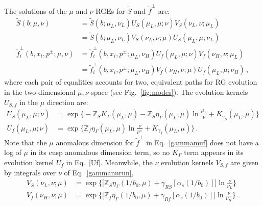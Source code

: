 \documentclass[a4,letterpaper,11pt]{article}
\newcommand{\nn}{\nonumber}
\newcommand{\as}{\alpha_s}
\newcommand{\zed}{\mathbb{Z}}
\newcommand{\wt}{\widetilde}
\newcommand{\eq}[1]{Eq.~\eqref{#1}}
\newcommand{\fig}[1]{Fig.~\ref{fig:#1}}
\begin{document}
The solutions of the $\mu$ and $\nu$ RGEs for $\wt S$ and $\wt f^\perp$ are:
\begin{subequations}
\begin{align}
\label{Sevolved}
\wt S(b;\mu,\nu) &= \wt S(b;\mu_L,\nu_L)U_S(\mu_L,\mu;\nu)V_S(\nu_L,\nu;\mu_L)  \\
&=  \wt S(b;\mu_L,\nu_L)V_S(\nu_L,\nu;\mu)U_S(\mu_L,\mu;\nu_L) \nn \\
\label{fevolved}
\wt f_i^\perp(b,x_i,p^\pm;\mu,\nu) &= \wt f_i^\perp(b,x_i,p^\pm;\mu_L,\nu_H)U_f(\mu_L,\mu;\nu)V_f(\nu_H,\nu;\mu_L) \\
&=  \wt f_i^\perp(b,x_i,p^\pm;\mu_L,\nu_H)V_f(\nu_H,\nu;\mu)U_f(\mu_L,\mu;\nu_H)\,,  \nn
\end{align}
\end{subequations}
where each pair of equalities accounts for two, equivalent paths for RG evolution in the two-dimensional $\mu,\nu$-space (see \fig{modes}). The evolution kernels $U_{S,f}$ in the $\mu$ direction are:
\begin{subequations}
\label{USUf}
\begin{align}
\label{US}
U_S(\mu_L,\mu;\nu) &= \exp\biggl\{-\zed_S K_\Gamma(\mu_L,\mu) - \zed_S \eta_\Gamma(\mu_L,\mu)\ln \frac{\mu_L}{\nu} + K_{\gamma_S}(\mu_L,\mu)\biggr\} \\
\label{Uf}
U_f(\mu_L,\mu;\nu) &= \exp\biggl\{\zed_f \eta_\Gamma(\mu_L,\mu)\ln\frac{\nu}{p^\pm} + K_{\gamma_f}(\mu_L,\mu)\biggr\} \,.
\end{align}
\end{subequations}
Note that the $\mu$ anomalous dimension for $\wt f^\perp$ in \eq{gammamuf} does not have a log of $\mu$ in its cusp anomalous dimension term, so no $K_\Gamma$ term appears in its evolution kernel $U_f$ in \eq{Uf}. Meanwhile, the $\nu$ evolution kernels $V_{S,f}$ are given by integrals over $\nu$ of \eq{gammanurun},
\begin{subequations}
\label{VSVf}
\begin{align}
\label{VS}
V_S(\nu_L,\nu;\mu) &= \exp\biggl\{\biggl[\zed_S \eta_\Gamma(1/b_0,\mu) + \gamma_{RS}[\as(1/b_0)]\biggr]\ln\frac{\nu}{\nu_L}\biggr\} \\
\label{Vf}
V_f(\nu_H,\nu;\mu) &=\exp\biggl\{\biggl[\zed_f \eta_\Gamma(1/b_0,\mu) + \gamma_{Rf}[\as(1/b_0)]\biggr]\ln\frac{\nu}{\nu_H}\biggr\} \,.
\end{align}
\end{subequations}

\end{document}
